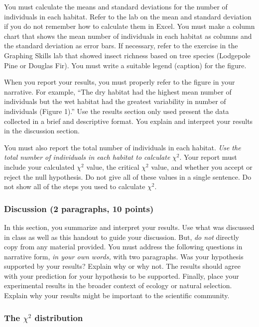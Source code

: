 \documentclass[12pt, hidelinks]{exam}
\newcommand\chisq{$\chi^2$}
\begin{document}
You must calculate the means and standard deviations for the number of individuals in each habitat. Refer to the lab on the mean and standard deviation if you do not remember how to calculate them in Excel. You must make a column chart that shows the mean number of individuals in each habitat as columns and the standard deviation as error bars. If necessary, refer to the exercise in the Graphing Skills lab that showed insect richness based on tree species (Lodgepole Pine or Douglas Fir). You must write a suitable legend (caption) for the figure. 

When you report your results, you must properly refer to the figure in your narrative. For example, ``The dry habitat had the highest mean number of individuals but the wet habitat had the greatest variability in number of individuals (Figure 1).'' Use the results section only used  present the data collected in a brief and
descriptive format. You explain and interpret your results in the discussion section.   

You must also report the total number of individuals in each habitat. \emph{Use the total number of individuals in each habitat to calculate} \chisq{}. Your report must include your calculated \chisq{} value, the critical \chisq{} value, and whether you accept or reject the null hypothesis. Do not give all of these values in a single sentence. Do not show all of the steps you used to calculate \chisq{}. 


\subsubsection*{Discussion (2 paragraphs, 10 points)} 

In this section, you summarize and interpret your results. Use what
was discussed in class as well as this handout to guide
your discussion. But, \emph{do not} directly copy from any material provided.
You must address the following questions in narrative form, \emph{in your own words,} with two
paragraphs. Was your hypothesis supported by your results? Explain why or why not. 
The results should agree with your prediction for your hypothesis to be supported. 
Finally, place your experimental results in the broader context of ecology or natural
selection. Explain why your results might be important to the
scientific community.

\subsubsection*{The \chisq{} distribution}
\end{document}
